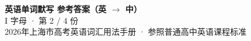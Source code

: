 \documentclass[10pt,a4paper]{article}
\begin{document}
\pagestyle{plain}

\begin{center}
{\LARGE\bfseries 英语单词默写 \quad 参考答案（英 $\to$ 中）}\\[0.22em]
{\large I 字母 · 第 2 / 4 份}\\[0.18em]
{\small 2026年上海市高考英语词汇用法手册 · 参照普通高中英语课程标准}
\end{center}

\vspace{0.2em}
\noindent{\color{rulegray}\rule{\textwidth}{0.8pt}}

\vspace{0.35em}

\vspace{0.25em}
\renewcommand{\arraystretch}{1.32}
\end{document}
